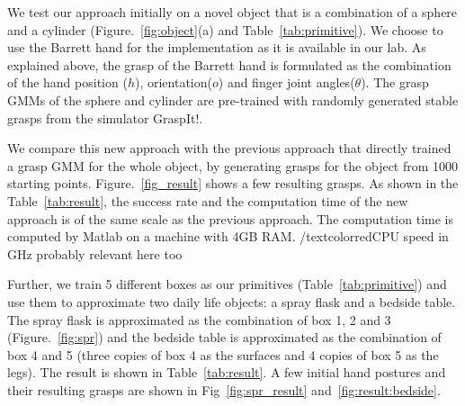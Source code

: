 We test our approach initially on a novel object that is a combination of a sphere and a cylinder (Figure.~\ref{fig:object}(a) and Table~\ref{tab:primitive}). We choose to use the Barrett hand for the implementation as it is available in our lab. As explained above, the grasp of the Barrett hand is formulated as the combination of the hand position ($h$), orientation($o$) and finger joint angles($\theta$).  The grasp GMMs of the sphere and cylinder are pre-trained with randomly generated stable grasps from the simulator GraspIt!.

We compare this new approach with the previous approach that directly trained a grasp GMM for the whole object, by generating grasps for the object from 1000 starting points. Figure.~\ref{fig_result} shows a few resulting grasps. As shown in the Table~\ref{tab:result}, the success rate and the computation time of the new approach is of the same scale as the previous approach. The computation time is computed by Matlab on a machine with 4GB RAM.
/textcolor{red}{CPU speed in GHz probably relevant here too}

Further, we train 5 different boxes as our primitives (Table~\ref{tab:primitive}) and use them to approximate two daily life objects: a spray flask and a bedside table. The spray flask is approximated as the combination of box 1, 2 and 3 (Figure.~\ref{fig:spr}) and the bedside table is approximated as the combination of box 4 and 5 (three copies of box 4 as the surfaces and 4 copies of box 5 as the legs). The result is shown in Table~\ref{tab:result}. A few initial hand postures and their resulting grasps are shown in Fig~\ref{fig:spr_result} and~\ref{fig:result:bedside}.

